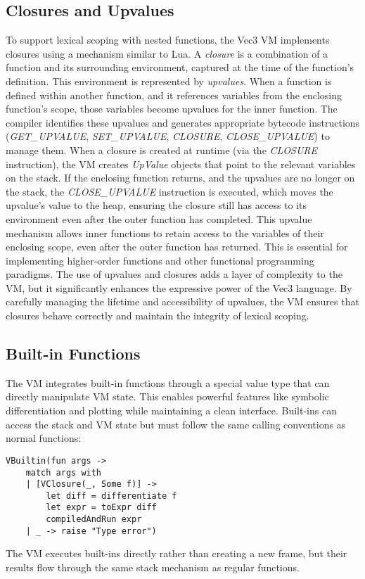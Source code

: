 \subsection{Closures and Upvalues}\label{subsec:closures-and-upvalues}
To support lexical scoping with nested functions, the Vec3 VM implements closures using a mechanism similar to Lua.
A \textit{closure} is a combination of a function and its surrounding environment, captured at the time of the function's definition.
This environment is represented by \textit{upvalues}.
When a function is defined within another function, and it references variables from the enclosing function's scope, those variables become upvalues for the inner function.
 The compiler identifies these upvalues and generates appropriate bytecode instructions (\textit{GET\_UPVALUE}, 
\textit{SET\_UPVALUE}, \textit{CLOSURE}, \textit{CLOSE\_UPVALUE}) to manage them.
When a closure is created at runtime (via the \textit{CLOSURE} instruction), the VM creates \textit{UpValue} objects 
that point to the relevant variables on the stack.
If the enclosing function returns, and the upvalues are no longer on the stack, the \textit{CLOSE\_UPVALUE} 
instruction is executed, which moves the upvalue's value to the heap, ensuring the closure still has access to its environment even after the outer function has completed.
This upvalue mechanism allows inner functions to retain access to the variables of their enclosing scope, even after the outer function has returned.
This is essential for implementing higher-order functions and other functional programming paradigms.
The use of upvalues and closures adds a layer of complexity to the VM, but it significantly enhances the expressive power of the Vec3 language.
By carefully managing the lifetime and accessibility of upvalues, the VM ensures that closures behave correctly and maintain the integrity of lexical scoping.

\subsection{Built-in Functions}\label{subsec:built-in-functions}
The VM integrates built-in functions through a special value type that can directly manipulate VM state.
This enables powerful features like symbolic differentiation and plotting while maintaining a clean interface.
Built-ins can access the stack and VM state but must follow the same calling conventions as normal functions:

\begin{verbatim}
VBuiltin(fun args ->
    match args with
    | [VClosure(_, Some f)] ->
        let diff = differentiate f
        let expr = toExpr diff
        compiledAndRun expr
    | _ -> raise "Type error")
\end{verbatim}
The VM executes built-ins directly rather than creating a new frame, but their results flow through the same stack mechanism as regular functions.

